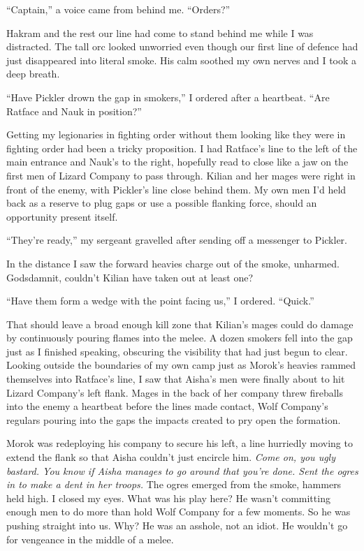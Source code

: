 \documentclass[12pt, openany]{book}
\begin{document}
“Captain,” a voice came from behind me. “Orders?”

Hakram and the rest our line had come to stand behind me while I was distracted. The tall orc looked unworried even though our first line of defence had just disappeared into literal smoke. His calm soothed my own nerves and I took a deep breath.

“Have Pickler drown the gap in smokers,” I ordered after a heartbeat. “Are Ratface and Nauk in position?”

Getting my legionaries in fighting order without them looking like they were in fighting order had been a tricky proposition. I had Ratface’s line to the left of the main entrance and Nauk’s to the right, hopefully read to close like a jaw on the first men of Lizard Company to pass through. Kilian and her mages were right in front of the enemy, with Pickler’s line close behind them. My own men I’d held back as a reserve to plug gaps or use a possible flanking force, should an opportunity present itself.

“They’re ready,” my sergeant gravelled after sending off a messenger to Pickler.

In the distance I saw the forward heavies charge out of the smoke, unharmed. Godsdamnit, couldn’t Kilian have taken out at least one?

“Have them form a wedge with the point facing us,” I ordered. “Quick.”

That should leave a broad enough kill zone that Kilian’s mages could do damage by continuously pouring flames into the melee. A dozen smokers fell into the gap just as I finished speaking, obscuring the visibility that had just begun to clear. Looking outside the boundaries of my own camp just as Morok’s heavies rammed themselves into Ratface’s line, I saw that Aisha’s men were finally about to hit Lizard Company’s left flank. Mages in the back of her company threw fireballs into the enemy a heartbeat before the lines made contact, Wolf Company’s regulars pouring into the gaps the impacts created to pry open the formation. 

Morok was redeploying his company to secure his left, a line hurriedly moving to extend the flank so that Aisha couldn’t just encircle him. \textit{Come on, you ugly bastard. You know if Aisha manages to go around that you’re done. Sent the ogres in to make a dent in her troops. }The ogres emerged from the smoke, hammers held high. I closed my eyes. What was his play here? He wasn’t committing enough men to do more than hold Wolf Company for a few moments. So he was pushing straight into us. Why? He was an asshole, not an idiot. He wouldn’t go for vengeance in the middle of a melee. 
\end{document}
